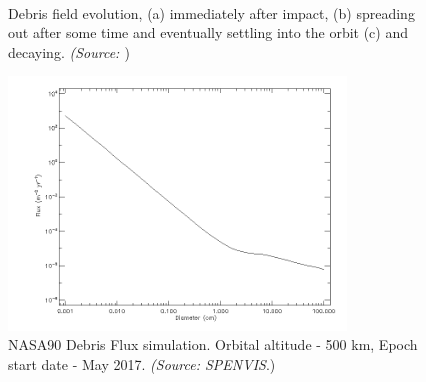 \begin{figure}
  \centering
  \\
  \caption{Debris field evolution, (a) immediately after impact, (b) spreading out after some time and eventually settling into the orbit (c) and decaying. \emph{(Source: \cite{constDesign}})}
  \label{fig:debris}
\end{figure}

\begin{figure}[!h]
\centering
\includegraphics[width=0.8\textwidth, angle=0]{chapters/img/debris.png}
\caption{NASA90 Debris Flux simulation. Orbital altitude - 500 km, Epoch start date - May 2017. \emph{(Source: SPENVIS}.)}
\label{fig:debrisModel}
\end{figure}

